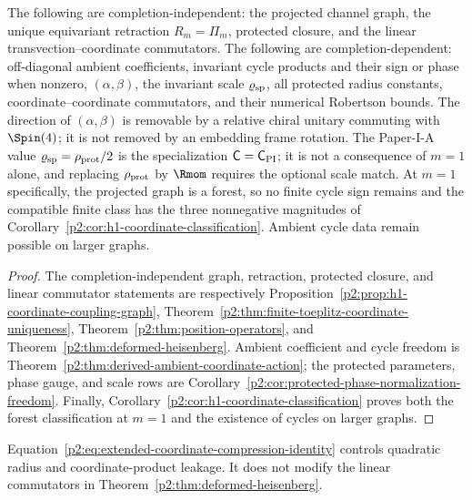 \documentclass[12pt,a4paper]{article}
\begin{document}
\begin{corollary}
\label{p2:cor:finite-coordinate-package-status}
The following are completion-independent: the projected channel graph, the
unique equivariant retraction \(R_m=\Pi_m\), protected closure, and the linear
transvection--coordinate commutators.  The following are
completion-dependent: off-diagonal ambient coefficients, invariant cycle
products and their sign or phase when nonzero,
\((\alpha,\beta)\), the invariant scale \(\varrho_{\rm sp}\), all protected radius
constants, coordinate--coordinate commutators, and their numerical Robertson
bounds.  The direction of \((\alpha,\beta)\) is removable by a relative
chiral unitary commuting with \(\Spin(4)\); it is not removed by an embedding
frame rotation.  The Paper-I-A value
\(\varrho_{\rm sp}=\rho_{\rm prot}/2\) is the specialization
\(\mathsf C=\mathsf C_{\rm PI}\); it is not a consequence of \(m=1\) alone, and
replacing \(\rho_{\rm prot}\) by \(\Rmom\) requires the optional scale match.
At \(m=1\) specifically, the projected graph is a forest, so no finite cycle
sign remains and the compatible finite class has the three nonnegative
magnitudes of
Corollary~\ref{p2:cor:h1-coordinate-classification}.  Ambient cycle data
remain possible on larger graphs.
\end{corollary}

\begin{proof}
The completion-independent graph, retraction, protected closure, and linear
commutator statements are respectively
Proposition~\ref{p2:prop:h1-coordinate-coupling-graph},
Theorem~\ref{p2:thm:finite-toeplitz-coordinate-uniqueness},
Theorem~\ref{p2:thm:position-operators}, and
Theorem~\ref{p2:thm:deformed-heisenberg}.  Ambient coefficient and cycle
freedom is Theorem~\ref{p2:thm:derived-ambient-coordinate-action}; the
protected parameters, phase gauge, and scale rows are
Corollary~\ref{p2:cor:protected-phase-normalization-freedom}.  Finally,
Corollary~\ref{p2:cor:h1-coordinate-classification} proves both the forest
classification at \(m=1\) and the existence of cycles on larger graphs.
\end{proof}

\begin{remark}
\label{p2:rem:projection-corrections}
Equation~\eqref{p2:eq:extended-coordinate-compression-identity} controls
quadratic radius and coordinate-product leakage.  It does not modify the
linear commutators in
Theorem~\ref{p2:thm:deformed-heisenberg}.
\end{remark}
\end{document}
